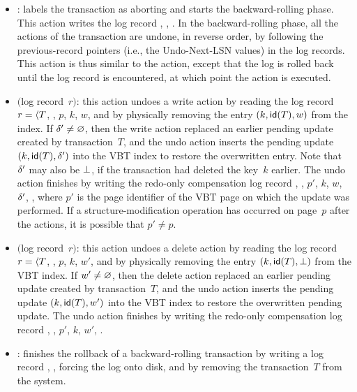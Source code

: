 \begin{itemize}
  \item {}: labels the transaction as aborting and starts the
  backward-rolling phase.
  This action writes the log record , ,
  . 
  In the backward-rolling phase, all the actions of the transaction are
  undone, in reverse order, by following the previous-record pointers (i.e.,
  the Undo-Next-LSN values) in the log records. 
  This action is thus similar to the  action,
  except that the log is rolled back until the  log record is
  encountered, at which point the  action is executed.

  \item {}$($log record~$r)$: this action undoes a write
  action by reading the log record $r =
  \langle T$, , $p$, $k$, $w$,  and by
  physically removing the entry $(k, \text{\textsf{id}}(T), w)$ from the index. 
  If $\delta' \neq \varnothing$, then the write action replaced an earlier
  pending update created by transaction~$T$, and the undo action inserts
  the pending update $(k, \text{\textsf{id}}(T), \delta')$ into the VBT index to
  restore the overwritten entry. 
  Note that $\delta'$ may also be $\bot$, if the transaction had
  deleted the key~$k$ earlier.
  The undo action finishes by writing the redo-only compensation log record 
  , , $p'$, $k$, $w$, $\delta'$, ,
  where $p'$ is the page identifier of the VBT page on which the update was
  performed. 
  If a structure-modification operation has occurred on page~$p$
  after the  actions, it is possible that $p' \neq p$.

  \item {}$($log record~$r)$: this action undoes a delete
  action by reading the log record $r =
  \langle T$, , $p$, $k$, $w'$,  and by physically
  removing the entry $(k, \text{\textsf{id}}(T), \bot)$ from the VBT index. 
  If $w' \neq \varnothing$, then the delete action replaced an earlier pending
  update created by transaction~$T$, and the undo action inserts the
  pending update $(k, \text{\textsf{id}}(T), w')$ into the VBT index to restore the 
  overwritten pending update. 
  The undo action finishes by writing the redo-only compensation log record
  , , $p'$, $k$, $w'$, .

  \item {}: finishes the rollback of a backward-rolling
  transaction by writing a log record ,
  , forcing the log onto disk, and
  by removing the transaction~$T$ from the system.
\end{itemize}

